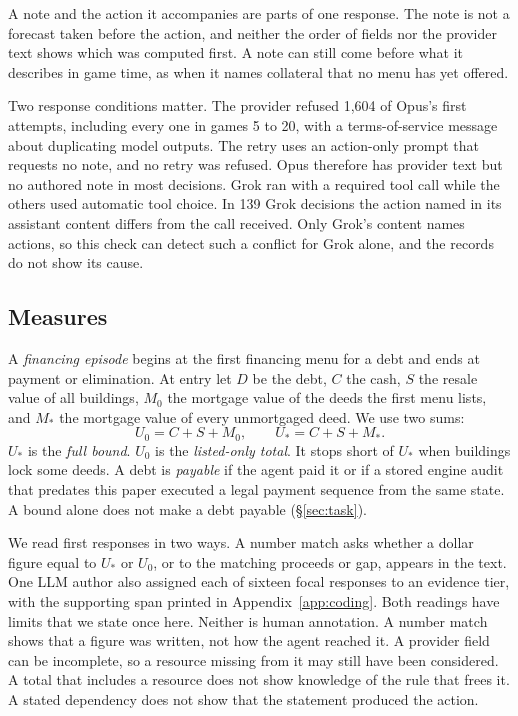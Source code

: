A note and the action it accompanies are parts of one response. The note is not a forecast taken before the action, and neither the order of fields nor the provider text shows which was computed first. A note can still come before what it describes in game time, as when it names collateral that no menu has yet offered.

Two response conditions matter. The provider refused 1,604 of Opus's first attempts, including every one in games 5 to 20, with a terms-of-service message about duplicating model outputs. The retry uses an action-only prompt that requests no note, and no retry was refused. Opus therefore has provider text but no authored note in most decisions. Grok ran with a required tool call while the others used automatic tool choice. In 139 Grok decisions the action named in its assistant content differs from the call received. Only Grok's content names actions, so this check can detect such a conflict for Grok alone, and the records do not show its cause.

\subsection{Measures}
A \emph{financing episode} begins at the first financing menu for a debt and ends at payment or elimination. At entry let $D$ be the debt, $C$ the cash, $S$ the resale value of all buildings, $M_0$ the mortgage value of the deeds the first menu lists, and $M_*$ the mortgage value of every unmortgaged deed. We use two sums:
\[U_0 = C + S + M_0,\qquad U_* = C + S + M_*.\]
$U_*$ is the \emph{full bound}. $U_0$ is the \emph{listed-only total}. It stops short of $U_*$ when buildings lock some deeds. A debt is \emph{payable} if the agent paid it or if a stored engine audit that predates this paper executed a legal payment sequence from the same state. A bound alone does not make a debt payable (\S\ref{sec:task}).

We read first responses in two ways. A number match asks whether a dollar figure equal to $U_*$ or $U_0$, or to the matching proceeds or gap, appears in the text. One LLM author also assigned each of sixteen focal responses to an evidence tier, with the supporting span printed in Appendix~\ref{app:coding}. Both readings have limits that we state once here. Neither is human annotation. A number match shows that a figure was written, not how the agent reached it. A provider field can be incomplete, so a resource missing from it may still have been considered. A total that includes a resource does not show knowledge of the rule that frees it. A stated dependency does not show that the statement produced the action.
